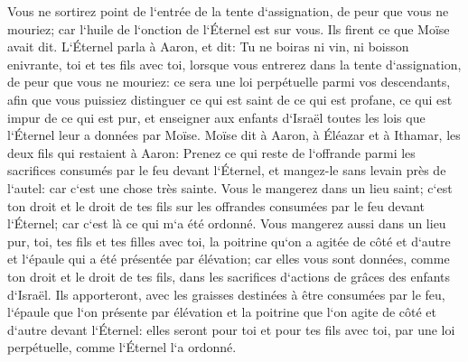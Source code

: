 \verse Vous ne sortirez point de l`entrée de la tente d`assignation, de peur que vous ne mouriez; car l`huile de l`onction de l`Éternel est sur vous. Ils firent ce que Moïse avait dit. 
\verse L`Éternel parla à Aaron, et dit: 
\verse Tu ne boiras ni vin, ni boisson enivrante, toi et tes fils avec toi, lorsque vous entrerez dans la tente d`assignation, de peur que vous ne mouriez: ce sera une loi perpétuelle parmi vos descendants, 
\verse afin que vous puissiez distinguer ce qui est saint de ce qui est profane, ce qui est impur de ce qui est pur, 
\verse et enseigner aux enfants d`Israël toutes les lois que l`Éternel leur a données par Moïse. 
\verse Moïse dit à Aaron, à Éléazar et à Ithamar, les deux fils qui restaient à Aaron: Prenez ce qui reste de l`offrande parmi les sacrifices consumés par le feu devant l`Éternel, et mangez-le sans levain près de l`autel: car c`est une chose très sainte. 
\verse Vous le mangerez dans un lieu saint; c`est ton droit et le droit de tes fils sur les offrandes consumées par le feu devant l`Éternel; car c`est là ce qui m`a été ordonné. 
\verse Vous mangerez aussi dans un lieu pur, toi, tes fils et tes filles avec toi, la poitrine qu`on a agitée de côté et d`autre et l`épaule qui a été présentée par élévation; car elles vous sont données, comme ton droit et le droit de tes fils, dans les sacrifices d`actions de grâces des enfants d`Israël. 
\verse Ils apporteront, avec les graisses destinées à être consumées par le feu, l`épaule que l`on présente par élévation et la poitrine que l`on agite de côté et d`autre devant l`Éternel: elles seront pour toi et pour tes fils avec toi, par une loi perpétuelle, comme l`Éternel l`a ordonné. 
